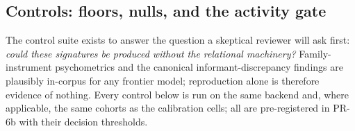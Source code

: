 \documentclass[12pt, letterpaper]{article}
\begin{document}
\subsection{Controls: floors, nulls, and the activity gate}
\label{sec:controls}

The control suite exists to answer the question a skeptical reviewer will ask first: \emph{could these signatures be produced without the relational machinery?} Family-instrument psychometrics and the canonical informant-discrepancy findings are plausibly in-corpus for any frontier model; reproduction alone is therefore evidence of nothing. Every control below is run on the same backend and, where applicable, the same cohorts as the calibration cells; all are pre-registered in PR-6b with their decision thresholds.
\end{document}

